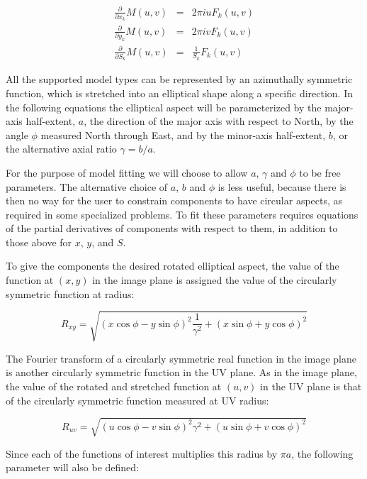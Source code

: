\documentclass[11pt]{article}
\begin{document}
\begin{eqnarray}
\frac{\partial}{\partial x_{k}} M(u,v) & = & 2 \pi i u F_{k}(u,v) \\
%
\frac{\partial}{\partial y_{k}} M(u,v) & = & 2 \pi i v F_{k}(u,v) \\
%
\frac{\partial}{\partial S_{k}} M(u,v) & = & \frac{1}{S_{k}} F_{k}(u,v)
\end{eqnarray}

All the supported model types can be represented by an azimuthally
symmetric function, which is stretched into an elliptical shape along
a specific direction. In the following equations the elliptical aspect
will be parameterized by the major-axis half-extent, $a$, the
direction of the major axis with respect to North, by the angle $\phi$
measured North through East, and by the minor-axis half-extent, $b$,
or the alternative axial ratio $\gamma = b/a$.

For the purpose of model fitting we will choose to allow $a$, $\gamma$
and $\phi$ to be free parameters. The alternative choice of $a$,
$b$ and $\phi$ is less useful, because there is then no way for the
user to constrain components to have circular aspects, as required in
some specialized problems. To fit these parameters requires equations
of the partial derivatives of components with respect to them, in
addition to those above for $x$, $y$, and $S$.

To give the components the desired rotated elliptical aspect, the
value of the function at $(x,y)$ in the image plane is assigned the
value of the circularly symmetric function at radius:

\begin{equation}
R_{xy} = \sqrt{(x\cos{\phi}-y\sin{\phi})^{2}\frac{1}{\gamma^{2}} + (x\sin{\phi}+y\cos{\phi})^{2}}
\end{equation}

The Fourier transform of a circularly symmetric real function in the
image plane is another circularly symmetric function in the UV plane.
As in the image plane, the value of the rotated and stretched
function at $(u,v)$ in the UV plane is that of the circularly
symmetric function measured at UV radius:

\begin{equation}
R_{uv} = \sqrt{(u\cos{\phi}-v\sin{\phi})^{2}\gamma^{2}+(u\sin{\phi}+v\cos{\phi})^{2}}
\end{equation}

Since each of the functions of interest multiplies this radius by
$\pi a$, the following parameter will also be defined:
\end{document}
